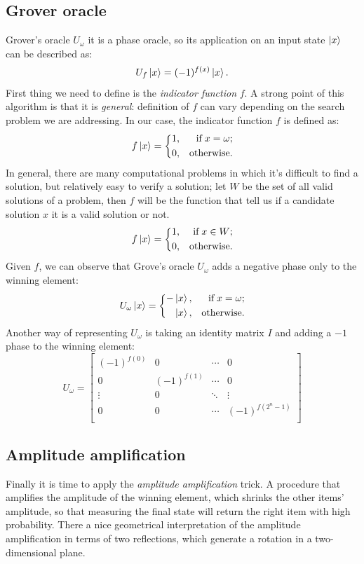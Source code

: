 \documentclass{article}
\begin{document}
\subsection{Grover oracle}
Grover's oracle $U_\omega$ it is a phase oracle, so its application on an input
state $\ket{x}$ can be described as:
\[
  U_f \ket{x} = (-1)^{f(x)} \ket{x}.
\]
First thing we need to define is the \emph{indicator function} $f$.
A strong point of this algorithm is that it is \emph{general}:
definition of $f$ can vary depending on the search problem we are addressing.
In our case, the indicator function $f$ is defined as:
\[
  f \ket{x} = \bigg\{
  \begin{aligned}
    1, && \text{if} \; x = \omega; \\
    0, && \text{otherwise}.
  \end{aligned}
\]
In general, there are many computational problems in which it’s difficult to
find a solution, but relatively easy to verify a solution; let $W$ be the
set of all valid solutions of a problem, then $f$ will be the function that
tell us if a candidate solution $x$ it is a valid solution or not.
\[
  f \ket{x} = \bigg\{
  \begin{aligned}
    1, && \text{if} \; x \in W; \\
    0, && \text{otherwise}.
  \end{aligned}
\]
Given $f$, we can observe that Grove's oracle $U_\omega$ adds a negative
phase only to the winning element:
\[
  U_\omega \ket{x} = \bigg\{
  \begin{aligned}
    - \ket{x}, && \text{if} \; x = \omega; \\
    \ket{x},   && \text{otherwise}.
  \end{aligned}
\]
Another way of representing $U_\omega$ is taking an identity matrix $I$ and
adding a $-1$ phase to the winning element:
\[
  U_\omega =
  \begin{bmatrix}
    (-1)^{f(0)} &   0         & \cdots &   0         \\
    0           & (-1)^{f(1)} & \cdots &   0         \\
    \vdots      &   0         & \ddots & \vdots      \\
    0           &   0         & \cdots & (-1)^{f(2^n-1)} \\
  \end{bmatrix}
\]

\subsection{Amplitude amplification}
Finally it is time to apply the \emph{amplitude amplification} trick.
A procedure that amplifies the amplitude of the winning element,
which shrinks the other items' amplitude, so that measuring the final state
will return the right item with high probability.
There a nice geometrical interpretation of the amplitude amplification in terms
of two reflections, which generate a rotation in a two-dimensional plane.
\end{document}
